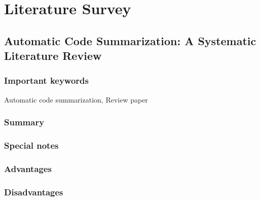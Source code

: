 \chapter{Literature Survey}







\section[zhu2019automatic\_code\_summary\_review\_paper]{Automatic Code Summarization: A Systematic Literature Review \cite{zhu2019automatic_code_summary_review_paper}}

\subsection{Important keywords}
Automatic code summarization, Review paper
\subsection{Summary}

\subsection{Special notes}

\subsection{Advantages}

\subsection{Disadvantages}

